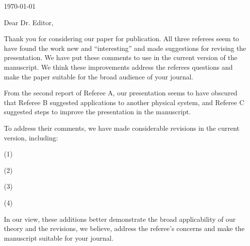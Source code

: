 
\begin{figure}
	\centering
\end{figure}{}

\vspace{0.25in}

\hfill\today\\

\thispagestyle{empty}

\thispagestyle{empty}

\noindent Dear Dr. Editor,\\

\smallskip

Thank you for considering our paper  for publication.
All three referees seem to have found the work new and ``interesting'' and made suggestions for revising the presentation.
We have put these comments to use in the current version of the manuscript.
We think these improvements address the referees questions and make the paper suitable for the broad audience of your journal.

From the second report of Referee A, our presentation seems to have obscured that
Referee B suggested applications to another physical system, and Referee C suggested steps to improve the presentation in the manuscript.

To address their comments, we have made considerable revisions in the current version, including:

(1) 

(2) 

(3) 

(4) 




In our view, these additions better demonstrate the broad applicability of our theory and the revisions, we believe, address the referee's concerns and make the manuscript suitable for your journal.

